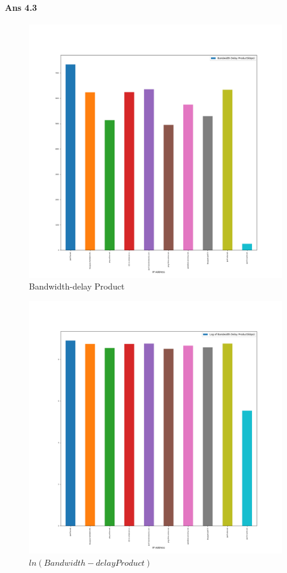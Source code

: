 \documentclass[paper=a4, fontsize=10pt]{scrartcl} %
\numberwithin{equation}{section} %
\numberwithin{figure}{section} %
\numberwithin{table}{section} %
\begin{document}
\paragraph{Ans 4.3}
\begin{figure}[htbp!]
    \centering
    \includegraphics[width=0.99\textwidth]{bandwidth_delay_bar.png}
    \caption{Bandwidth-delay Product}%
    \vspace{-1em}
\end{figure}
\begin{figure}[htbp!]
    \centering
    \includegraphics[width=0.99\textwidth]{bandwidth_delay_log_bar.png}
    \caption{$ln(Bandwidth-delay Product)$}%
    \vspace{-1em}
\end{figure}
\end{document}
